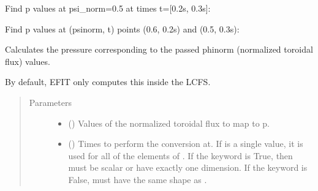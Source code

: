 \documentclass[letterpaper,10pt,english]{sphinxmanual}
\begin{document}
\begin{fulllineitems}
\begin{fulllineitems}
Find p values at psi\_norm=0.5 at times t={[}0.2s, 0.3s{]}:

\begin{sphinxVerbatim}[commandchars=\\\{\}]
   \PYG{p}{[} \PYG{p}{]}
\end{sphinxVerbatim}

Find p values at (psinorm, t) points (0.6, 0.2s) and (0.5, 0.3s):

\begin{sphinxVerbatim}[commandchars=\\\{\}]
  \PYG{p}{[} \PYG{p}{]} \PYG{p}{[} \PYG{p}{]} 
\end{sphinxVerbatim}

\end{fulllineitems}


\begin{fulllineitems}
\label{\detokenize{eqtools:eqtools.core.Equilibrium.phinorm2p}}
Calculates the pressure corresponding to the passed phinorm (normalized toroidal flux) values.

By default, EFIT only computes this inside the LCFS.
\begin{quote}\begin{description}
\item[{Parameters}] \leavevmode\begin{itemize}
\item {} 
 () \textendash{} Values of the normalized
toroidal flux to map to p.

\item {} 
 () \textendash{} Times to perform the conversion at.
If  is a single value, it is used for all of the elements of
. If the  keyword is True, then  must be scalar
or have exactly one dimension. If the  keyword is False,
 must have the same shape as .


\end{itemize}
\end{description}
\end{quote}
\end{fulllineitems}
\end{fulllineitems}
\end{document}
